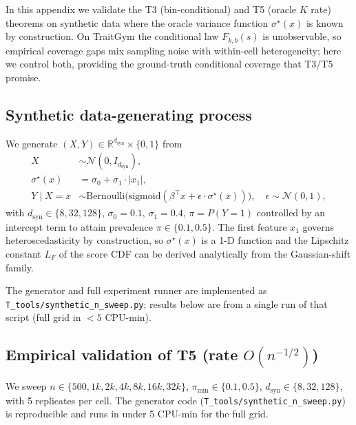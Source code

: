 
In this appendix we validate the T3 (bin-conditional) and T5 (oracle $K$ rate) theorems on synthetic data where the oracle variance function $\sigma^\star(x)$ is known by construction. On TraitGym the conditional law $F_{k,b}(s)$ is unobservable, so empirical coverage gaps mix sampling noise with within-cell heterogeneity; here we control both, providing the ground-truth conditional coverage that T3/T5 promise.

\subsection{Synthetic data-generating process}
\label{app:synthetic:dgp}

We generate $(X, Y) \in \mathbb{R}^{d_{\mathrm{syn}}} \times \{0, 1\}$ from
\begin{align*}
X &\sim \mathcal{N}(0, I_{d_{\mathrm{syn}}}), \\
\sigma^\star(x) &= \sigma_0 + \sigma_1 \cdot |x_1|, \\
Y \mid X = x &\sim \mathrm{Bernoulli}\bigl(\mathrm{sigmoid}(\beta^\top x + \epsilon \cdot \sigma^\star(x))\bigr), \quad \epsilon \sim \mathcal{N}(0, 1),
\end{align*}
with $d_{\mathrm{syn}} \in \{8, 32, 128\}$, $\sigma_0 = 0.1$, $\sigma_1 = 0.4$, $\pi = P(Y = 1)$ controlled by an intercept term to attain prevalence $\pi \in \{0.1, 0.5\}$. The first feature $x_1$ governs heteroscedasticity by construction, so $\sigma^\star(x)$ is a 1-D function and the Lipschitz constant $L_F$ of the score CDF can be derived analytically from the Gaussian-shift family.

The generator and full experiment runner are implemented as \texttt{T\_tools/synthetic\_n\_sweep.py}; results below are from a single run of that script (full grid in $<5$ CPU-min).

\subsection{Empirical validation of T5 (rate $O(n^{-1/2})$)}
\label{app:synthetic:t5}

We sweep $n \in \{500, 1k, 2k, 4k, 8k, 16k, 32k\}$, $\pi_{\min} \in \{0.1, 0.5\}$, $d_{\mathrm{syn}} \in \{8, 32, 128\}$, with 5 replicates per cell. The generator code (\texttt{T\_tools/synthetic\_n\_sweep.py}) is reproducible and runs in under 5 CPU-min for the full grid.

